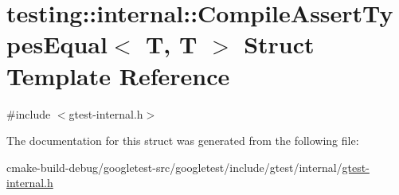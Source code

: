 \hypertarget{structtesting_1_1internal_1_1CompileAssertTypesEqual_3_01T_00_01T_01_4}{}\section{testing\+::internal\+::Compile\+Assert\+Types\+Equal$<$ T, T $>$ Struct Template Reference}
\label{structtesting_1_1internal_1_1CompileAssertTypesEqual_3_01T_00_01T_01_4}


{\ttfamily \#include $<$gtest-\/internal.\+h$>$}



The documentation for this struct was generated from the following file\+:\begin{DoxyCompactItemize}
\item 
cmake-\/build-\/debug/googletest-\/src/googletest/include/gtest/internal/\mbox{\hyperlink{gtest-internal_8h}{gtest-\/internal.\+h}}\end{DoxyCompactItemize}
